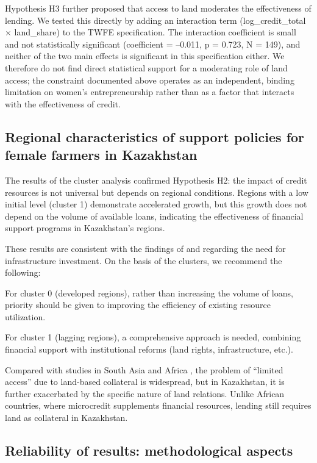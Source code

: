 ﻿\documentclass[pdflatex,sn-mathphys-ay]{sn-jnl}
\newif\ifrevmarks
\newcommand{\rev}[1]{\ifrevmarks\textcolor{red}{#1}\else#1\fi}
\begin{document}
\rev{Hypothesis H3 further proposed that access to land moderates the
effectiveness of lending. We tested this directly by adding an
interaction term (log\_credit\_total $\times$ land\_share) to the TWFE
specification. The interaction coefficient is small and not
statistically significant (coefficient = --0.011, p = 0.723, N = 149),
and neither of the two main effects is significant in this
specification either. We therefore do not find direct statistical
support for a moderating role of land access; the constraint documented
above operates as an independent, binding limitation on women's
entrepreneurship rather than as a factor that interacts with the
effectiveness of credit.}

\subsection{Regional characteristics of support policies for female farmers in Kazakhstan}

The results of the cluster analysis confirmed Hypothesis H2: the impact
of credit resources is not universal but depends on regional conditions.
Regions with a low initial level (cluster 1) demonstrate accelerated
growth, but this growth does not depend on the volume of available
loans, indicating the effectiveness of financial support programs in
Kazakhstan's regions.

These results are consistent with the findings of \citet{ref21} and \citet{ref54} regarding the need for infrastructure
investment. On the basis of the clusters, we recommend the following:

For cluster 0 (developed regions), rather than increasing the volume of
loans, priority should be given to improving the efficiency of existing
resource utilization.

For cluster 1 (lagging regions), a comprehensive approach is needed,
combining financial support with institutional reforms (land rights,
infrastructure, etc.).

Compared with studies in South Asia \citep{ref44} and Africa
\citep{ref27}, the problem of ``limited access'' due to
land-based collateral is widespread, but in Kazakhstan, it is further
exacerbated by the specific nature of land relations. Unlike African
countries, where microcredit supplements financial resources, lending
still requires land as collateral in Kazakhstan.

\subsection{Reliability of results: methodological aspects}
\end{document}
